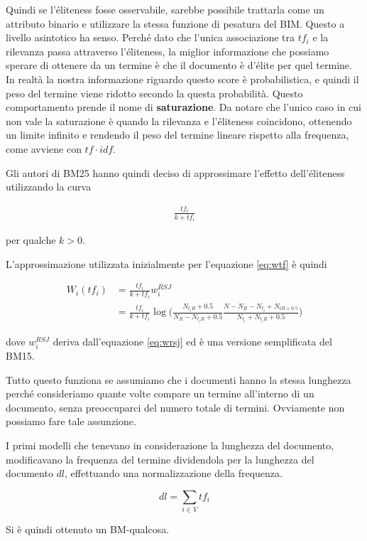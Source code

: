 Quindi se l'éliteness fosse osservabile, sarebbe possibile trattarla come un attributo binario e utilizzare la stessa funzione di pesatura del BIM.
Questo a livello asintotico ha senso. Perché dato che l'unica associazione tra $tf_i$ e la rilevanza passa attraverso l'éliteness, la miglior informazione che possiamo sperare di ottenere da un termine è che il documento è d'élite per quel termine. In realtà la nostra informazione riguardo questo score è probabilistica, e quindi il peso del termine viene ridotto secondo la questa probabilità. Questo comportamento prende il nome di \textbf{saturazione}.
Da notare che l'unico caso in cui non vale la saturazione è quando la rilevanza e l'éliteness coincidono, ottenendo un limite infinito e rendendo il peso del termine lineare rispetto alla frequenza, come avviene con $tf\cdot idf$.

Gli autori di BM25 hanno quindi deciso di approssimare l'effetto dell'éliteness utilizzando la curva

\begin{align}
\frac{tf_i}{k + tf_i} \label{eq:raw}
\end{align}

\noindent per qualche $k > 0$.

L'approssimazione utilizzata inizialmente per l'equazione \ref{eq:wtf} è quindi

\begin{align*}
W_i(tf_i) &= \frac{tf_i}{k + tf_i}  w_i^{RSJ} \\
&=\frac{tf_i}{k + tf_i}  \log \bigg( \frac{N_{t_iR} + 0.5}{N_R - N_{t_iR} + 0.5} \frac{N - N_R - N_{t_i} + N_{tR + 0.5}}{N_{t_i} + N_{t_iR} +0.5} \bigg)
\end{align*}

\noindent dove $w_i^{RSJ}$ deriva dall'equazione \ref{eq:wrsj} ed è una versione semplificata del BM15.

Tutto questo funziona se assumiamo che i documenti hanno la stessa lunghezza perché consideriamo quante volte compare un termine all'interno di un documento, senza preoccuparci del numero totale di termini. Ovviamente non possiamo fare tale assunzione.

I primi modelli che tenevano in considerazione la lunghezza del documento, modificavano la frequenza del termine dividendola per la lunghezza del documento $dl$, effettuando una normalizzazione della frequenza.

$$
dl = \sum\limits_{i \in V} tf_i
$$

\noindent Si è quindi ottenuto un BM-qualcosa.

